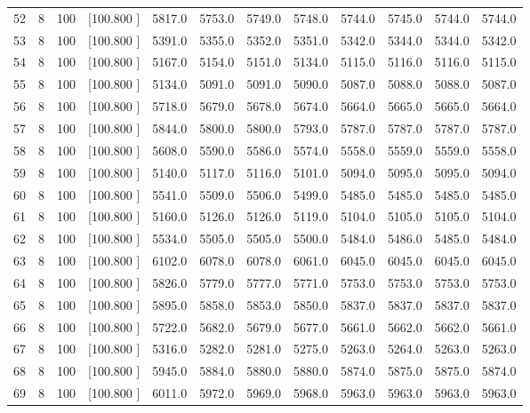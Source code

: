 \documentclass[12pt,a4paper]{article}
\begin{document}
\begin{center}
{\begin{tabular}{r r r r r r r r r r r r}
  52&  8&100&[100.800   ]&  5817.0&  5753.0&  5749.0&  5748.0&  5744.0&  5745.0&  5744.0&  5744.0\\[-0.02in]
  53&  8&100&[100.800   ]&  5391.0&  5355.0&  5352.0&  5351.0&  5342.0&  5344.0&  5344.0&  5342.0\\[-0.02in]
  54&  8&100&[100.800   ]&  5167.0&  5154.0&  5151.0&  5134.0&  5115.0&  5116.0&  5116.0&  5115.0\\[-0.02in]
  55&  8&100&[100.800   ]&  5134.0&  5091.0&  5091.0&  5090.0&  5087.0&  5088.0&  5088.0&  5087.0\\[-0.02in]
  56&  8&100&[100.800   ]&  5718.0&  5679.0&  5678.0&  5674.0&  5664.0&  5665.0&  5665.0&  5664.0\\[-0.02in]
  57&  8&100&[100.800   ]&  5844.0&  5800.0&  5800.0&  5793.0&  5787.0&  5787.0&  5787.0&  5787.0\\[-0.02in]
  58&  8&100&[100.800   ]&  5608.0&  5590.0&  5586.0&  5574.0&  5558.0&  5559.0&  5559.0&  5558.0\\[-0.02in]
  59&  8&100&[100.800   ]&  5140.0&  5117.0&  5116.0&  5101.0&  5094.0&  5095.0&  5095.0&  5094.0\\[-0.02in]
  60&  8&100&[100.800   ]&  5541.0&  5509.0&  5506.0&  5499.0&  5485.0&  5485.0&  5485.0&  5485.0\\[-0.02in]
  61&  8&100&[100.800   ]&  5160.0&  5126.0&  5126.0&  5119.0&  5104.0&  5105.0&  5105.0&  5104.0\\[-0.02in]
  62&  8&100&[100.800   ]&  5534.0&  5505.0&  5505.0&  5500.0&  5484.0&  5486.0&  5485.0&  5484.0\\[-0.02in]
  63&  8&100&[100.800   ]&  6102.0&  6078.0&  6078.0&  6061.0&  6045.0&  6045.0&  6045.0&  6045.0\\[-0.02in]
  64&  8&100&[100.800   ]&  5826.0&  5779.0&  5777.0&  5771.0&  5753.0&  5753.0&  5753.0&  5753.0\\[-0.02in]
  65&  8&100&[100.800   ]&  5895.0&  5858.0&  5853.0&  5850.0&  5837.0&  5837.0&  5837.0&  5837.0\\[-0.02in]
  66&  8&100&[100.800   ]&  5722.0&  5682.0&  5679.0&  5677.0&  5661.0&  5662.0&  5662.0&  5661.0\\[-0.02in]
  67&  8&100&[100.800   ]&  5316.0&  5282.0&  5281.0&  5275.0&  5263.0&  5264.0&  5263.0&  5263.0\\[-0.02in]
  68&  8&100&[100.800   ]&  5945.0&  5884.0&  5880.0&  5880.0&  5874.0&  5875.0&  5875.0&  5874.0\\[-0.02in]
  69&  8&100&[100.800   ]&  6011.0&  5972.0&  5969.0&  5968.0&  5963.0&  5963.0&  5963.0&  5963.0\\[-0.02in]

\end{tabular}}
\end{center}
\end{document}
